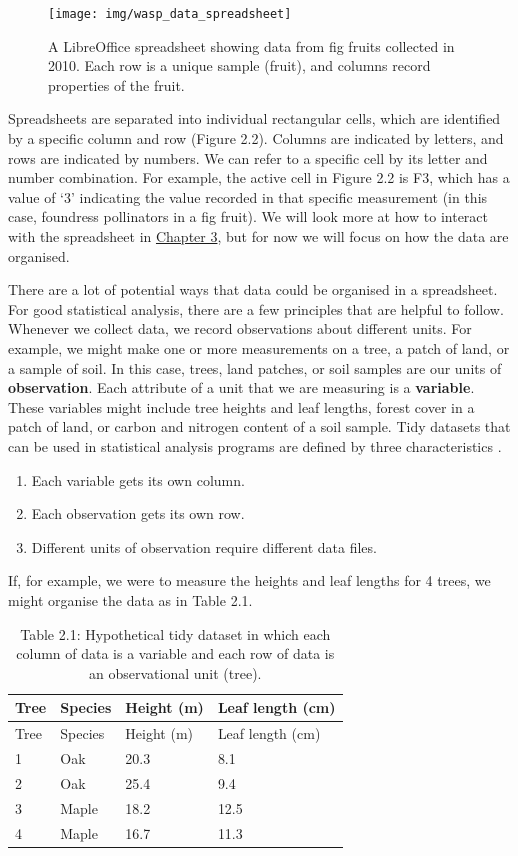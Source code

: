 \documentclass[
  openany]{scrbook}
\providecommand{\tightlist}{%
  \setlength{\itemsep}{0pt}\setlength{\parskip}{0pt}}
\begin{document}
\begin{figure}
\texttt{[image: img/wasp\_data\_spreadsheet]} \caption{A LibreOffice spreadsheet showing data from fig fruits collected in 2010. Each row is a unique sample (fruit), and columns record properties of the fruit.}\label{fig:unnamed-chunk-4}
\end{figure}

Spreadsheets are separated into individual rectangular cells, which are identified by a specific column and row (Figure 2.2).
Columns are indicated by letters, and rows are indicated by numbers.
We can refer to a specific cell by its letter and number combination.
For example, the active cell in Figure 2.2 is F3, which has a value of `3' indicating the value recorded in that specific measurement (in this case, foundress pollinators in a fig fruit).
We will look more at how to interact with the spreadsheet in \protect\hyperlink{Chapter_3}{Chapter 3}, but for now we will focus on how the data are organised.

There are a lot of potential ways that data could be organised in a spreadsheet.
For good statistical analysis, there are a few principles that are helpful to follow.
Whenever we collect data, we record observations about different units.
For example, we might make one or more measurements on a tree, a patch of land, or a sample of soil.
In this case, trees, land patches, or soil samples are our units of \textbf{observation}.
Each attribute of a unit that we are measuring is a \textbf{variable}.
These variables might include tree heights and leaf lengths, forest cover in a patch of land, or carbon and nitrogen content of a soil sample.
Tidy datasets that can be used in statistical analysis programs are defined by three characteristics \citep{Wickham2014}.

\begin{enumerate}
\def\labelenumi{\arabic{enumi}.}
\tightlist
\item
  Each variable gets its own column.
\item
  Each observation gets its own row.
\item
  Different units of observation require different data files.
\end{enumerate}

If, for example, we were to measure the heights and leaf lengths for 4 trees, we might organise the data as in Table 2.1.

\begin{longtable}[]{@{}llll@{}}
\caption{Table 2.1: Hypothetical tidy dataset in which each column of data is a variable and each row of data is an observational unit (tree).}\tabularnewline
\toprule
Tree & Species & Height (m) & Leaf length (cm) \\
\midrule
\endfirsthead
\toprule
Tree & Species & Height (m) & Leaf length (cm) \\
\midrule
\endhead
1 & Oak & 20.3 & 8.1 \\
2 & Oak & 25.4 & 9.4 \\
3 & Maple & 18.2 & 12.5 \\
4 & Maple & 16.7 & 11.3 \\
\bottomrule
\end{longtable}
\end{document}

